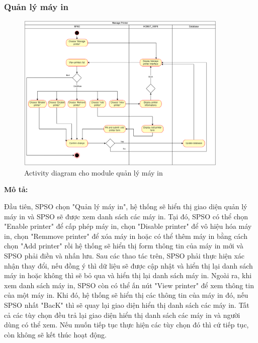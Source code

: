 \subsubsection{Quản lý máy in}
\begin{figure}[H]
    \begin{center}
        \includegraphics[width=0.9\textwidth]{Images/System Modelling/PM_Activity.png}
        \caption{Activity diagram cho module quản lý máy in}
        \label{fig:arch}
    \end{center}
\end{figure}
\textbf{Mô tả:}\par
Đầu tiên, SPSO chọn "Quản lý máy in", hệ thống sẽ hiển thị giao diện quản lý máy in và SPSO sẽ được xem danh sách các máy in. Tại đó, SPSO có thể chọn "Enable printer" để cấp phép máy in, chọn "Disable printer" để vô hiệu hóa máy in, chọn "Remmove printer" để xóa máy in hoặc có thể thêm máy in bằng cách chọn "Add printer" rồi hệ thống sẽ hiển thị form thông tin của máy in mới và SPSO phải điền và nhấn lưu. Sau các thao tác trên, SPSO phải thực hiện xác nhận thay đổi, nếu đồng ý thì dữ liệu sẽ được cập nhật và hiển thị lại danh sách máy in hoặc không thì sẽ bỏ qua và hiển thị lại danh sách máy in. Ngoài ra, khi xem danh sách máy in, SPSO còn có thể ấn nút "View printer" để xem thông tin của một máy in. Khi đó, hệ thống sẽ hiển thị các thông tin của máy in đó, nếu SPSO nhất "BacK" thì sẽ quay lại giao diện hiển thị danh sách các máy in. Tất cả các tùy chọn đều trả lại giao diện hiển thị danh sách các máy in và người dùng có thể xem. Nếu muốn tiếp tục thực hiện các tùy chọn đó thì cứ tiếp tục, còn không sẽ kết thúc hoạt động. 



